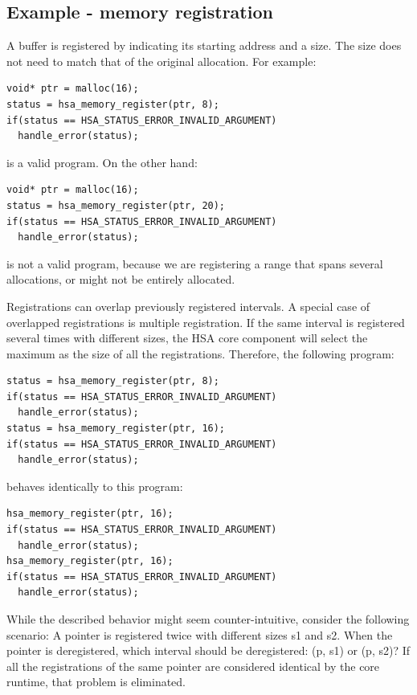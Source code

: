 \documentclass[final]{book}
\begin{document}
 

\subsection{Example - memory registration}

A buffer is registered by indicating its starting address and a size. The size
does not need to match that of the original allocation. For example:

\begin{lstlisting}
void* ptr = malloc(16);
status = hsa_memory_register(ptr, 8);
if(status == HSA_STATUS_ERROR_INVALID_ARGUMENT)
  handle_error(status);
\end{lstlisting}

is a valid program. On the other hand:

\begin{lstlisting}
void* ptr = malloc(16);
status = hsa_memory_register(ptr, 20);
if(status == HSA_STATUS_ERROR_INVALID_ARGUMENT)
  handle_error(status);
\end{lstlisting}

is not a valid program, because we are registering a range that spans several
allocations, or might not be entirely allocated.

Registrations can overlap previously registered intervals. A special case of
overlapped registrations is multiple registration. If the same interval is
registered several times with different sizes, the HSA core component will
select the maximum as the size of all the registrations. Therefore, the
following program:

\begin{lstlisting}
status = hsa_memory_register(ptr, 8);
if(status == HSA_STATUS_ERROR_INVALID_ARGUMENT)
  handle_error(status);
status = hsa_memory_register(ptr, 16);
if(status == HSA_STATUS_ERROR_INVALID_ARGUMENT)
  handle_error(status);
\end{lstlisting}

behaves identically to this program:

\begin{lstlisting}
hsa_memory_register(ptr, 16);
if(status == HSA_STATUS_ERROR_INVALID_ARGUMENT)
  handle_error(status);
hsa_memory_register(ptr, 16);
if(status == HSA_STATUS_ERROR_INVALID_ARGUMENT)
  handle_error(status);
\end{lstlisting}

While the described behavior might seem counter-intuitive, consider the
following scenario: A pointer is registered twice with different sizes s1 and
s2. When the pointer is deregistered, which interval should be deregistered: (p,
s1) or (p, s2)? If all the registrations of the same pointer are considered
identical by the core runtime, that problem is eliminated.
\end{document}
